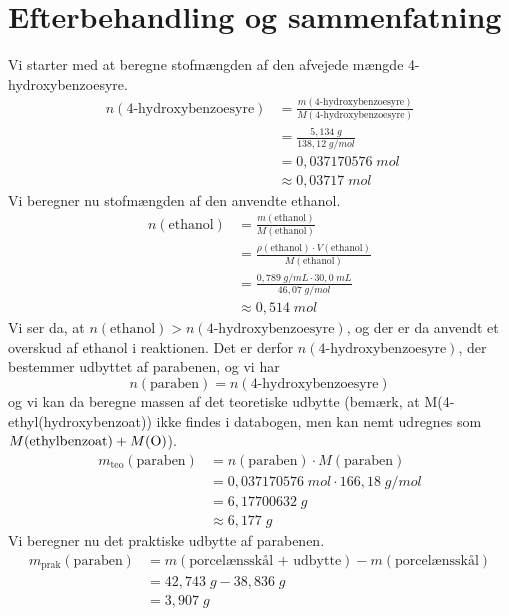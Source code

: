 \documentclass{report}
\begin{document}
\section*{Efterbehandling og sammenfatning}
Vi starter med at beregne stofmængden af den afvejede mængde 4-hydroxybenzoesyre.
\begin{equation*}
\begin{split}
  n(\text{4-hydroxybenzoesyre})&=\frac{m(\text{4-hydroxybenzoesyre})}{M(\text{4-hydroxybenzoesyre})}\\
  &=\frac{5,134 \;\unit{g} }{138,12 \;\unit{g/mol} }\\
  &=0,037170576 \;\unit{mol} \\
  &\approx 0,03717 \;\unit{mol} 
\end{split}
\end{equation*}
Vi beregner nu stofmængden af den anvendte ethanol.
\begin{equation*}
\begin{split}
  n(\text{ethanol} )&=\frac{m(\text{ethanol} )}{M(\text{ethanol} )}\\
  &=\frac{\rho(\text{ethanol} ) \cdot V(\text{ethanol} )}{M(\text{ethanol} )}\\
  &=\frac{0,789 \;\unit{g/mL} \cdot 30,0 \;\unit{mL} }{46,07 \;\unit{g/mol} }\\
  &\approx 0,514 \;\unit{mol} 
\end{split}
\end{equation*}
Vi ser da, at $n(\text{ethanol} )>n(\text{4-hydroxybenzoesyre} )$, og der er da anvendt et overskud af ethanol i reaktionen.
Det er derfor $n(\text{4-hydroxybenzoesyre})$, der bestemmer udbyttet af parabenen, og vi har
\[
n(\text{paraben} )=n(\text{4-hydroxybenzoesyre} )
\] 
og vi kan da beregne massen af det teoretiske udbytte (bemærk, at M(4-ethyl(hydroxybenzoat)) ikke findes i databogen, men kan nemt udregnes som $M(\text{ethylbenzoat}) + M(\ce{O} )$). 
\begin{equation*}
\begin{split}
  m_{\text{teo} }(\text{paraben} )&=n(\text{paraben} ) \cdot M(\text{paraben} )\\
  &=0,037170576 \;\unit{mol} \cdot 166,18 \;\unit{g/mol} \\
  &=6,17700632 \;\unit{g} \\
  &\approx 6,177 \;\unit{g} 
\end{split}
\end{equation*}
Vi beregner nu det praktiske udbytte af parabenen.
\begin{equation*}
\begin{split}
  m _{\text{prak} }(\text{paraben} )&=m(\text{porcelænsskål + udbytte} )-m(\text{porcelænsskål} )\\
  &=42,743 \;\unit{g} -38,836 \;\unit{g} \\
  &=3,907 \;\unit{g} 
\end{split}
\end{equation*}
\end{document}
